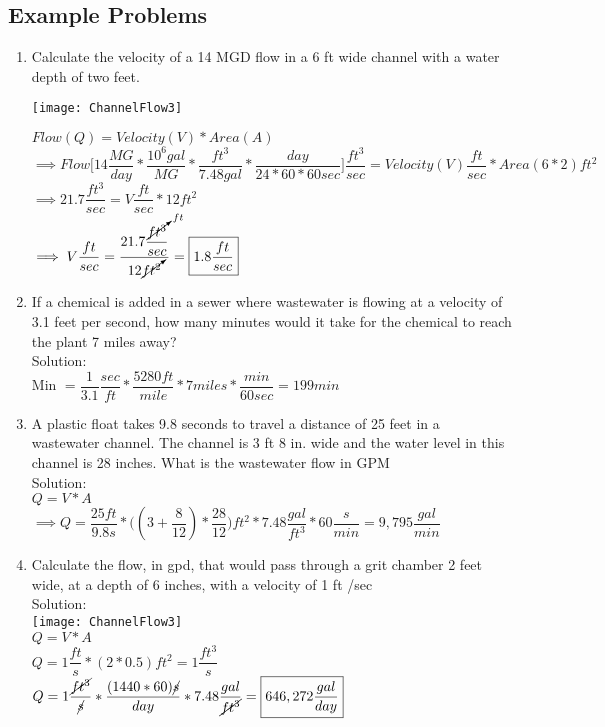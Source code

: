 \subsection{Example Problems}
\begin{enumerate}
\item Calculate the velocity of a 14 MGD flow in a 6 ft wide channel with a water depth of two feet.\\
\begin{center}
\texttt{[image: ChannelFlow3]}
\end{center}
$Flow (Q) = Velocity (V) * Area (A)$\\
$\implies Flow\Big[ 14 \dfrac{MG}{day}* \dfrac{10^6 gal}{MG} * \dfrac{ft^3}{7.48 gal}*\dfrac{day}{24*60*60sec}\Big]\dfrac{ft^3}{sec} = Velocity(V) \dfrac{ft}{sec}* Area (6 * 2) ft ^2$\\
\vspace{0.2cm}
$\implies 21.7 \dfrac{ft^3}{sec}= V\dfrac{ft}{sec}*12ft^2$\\
$\implies V \dfrac{ft}{sec}= \dfrac{21.7\dfrac{\cancelto{ft}{ft^3}}{sec}}{12\cancelto{}{ft^2}}= \boxed{1.8\dfrac{ft}{sec}}$\\

\item If a chemical is added in a sewer where wastewater is flowing at a velocity of 3.1 feet per second, how many minutes would it take for the chemical to reach the plant 7 miles away?\\
Solution:\\
Min $= \dfrac{1}{3.1}\dfrac{sec}{ft}*\dfrac{5280ft}{mile}*7 miles*\dfrac{min}{60 sec} = \boxed{199 min}$
\\

\item A plastic float takes 9.8 seconds to travel a distance of 25 feet in a wastewater channel. The channel is 3 ft 8 in. wide and the water level in this channel is 28 inches. What is the wastewater flow in GPM\\
Solution:\\
\vspace{0.3cm}
$Q=V*A$\\
$\implies Q=\dfrac{25ft}{9.8s}*\Big((3+\dfrac{8}{12})*\dfrac{28}{12}\Big)ft^2*7.48\dfrac{gal}{ft^3}*60\dfrac{s}{min}=\boxed{9,795\dfrac{gal}{min}}$



\item Calculate the flow, in gpd, that would pass through a grit chamber 2 feet wide, at a depth of 6 inches, with a velocity of 1 ft /sec\\
Solution:\\
\texttt{[image: ChannelFlow3]}\\
$Q=V*A$\\
$Q=1\dfrac{ft}{s}*(2*0.5)ft^2=1\dfrac{ft^3}{s}$\\
$Q=1\dfrac{\cancel{ft^3}}{\cancel{s}}*\dfrac{(1440*60)\cancel{s}}{day}*7.48\dfrac{gal}{\cancel{ft^3}}=\boxed{646,272\dfrac{gal}{day}}$
\end{enumerate}



